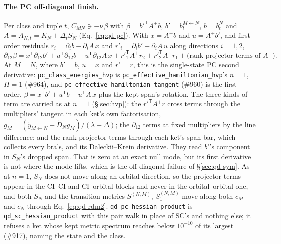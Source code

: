 \documentclass[11pt]{article}
\newcommand{\code}[1]{\texttt{#1}}
\newcommand{\T}{\mathsf T}
\begin{document}
\paragraph{The PC off-diagonal finish.} Per class and tuple $t$, $C_{MN}
\ni -\nu\,\beta$ with $\beta = b'^\T A^{+}b$, $b' = b^{M\leftarrow N}_t$, $b
= b^N_t$ and $A = A_{N,t} = K_N + \Delta_tS_N$ (Eq.~\eqref{eq:qd-pc}). With
$x = A^+b$ and $u = A^+b'$, and first-order residuals $r_i = \partial_ib -
\partial_iA\,x$ and $r'_i = \partial_ib' - \partial_iA\,u$ along directions
$i = 1, 2$,
\begin{equation}
  \partial_{12}\beta = x^\T\partial_{12}b' + u^\T\partial_{12}b
    - u^\T\partial_{12}A\,x
    + r'^\T_1A^+r_2 + r'^\T_2A^+r_1
    + \bigl(\text{rank-projector terms of }A^+\bigr).
  \label{eq:qd-pcfinish}
\end{equation}
At $M = N$, where $b' = b$, $u = x$ and $r' = r$, this is the single-state
PC second derivative: \code{pc\_class\_energies\_hvp} is
\code{pc\_effective\_hamiltonian\_hvp}'s $n = 1$, $\bar H = 1$ (\#964),
and \code{pc\_effective\_hamiltonian\_tangent} (\#960) is the first order,
$\dot\beta = x^\T\dot b' + u^\T\dot b - u^\T\dot A\,x$ plus the kept span's
rotation. The three kinds of term are carried as at $n = 1$
(\S\ref{sec:hvp}): the $r'^\T A^+r$ cross terms through the multipliers'
tangent in each ket's own factorisation, $\dot g_M = (\dot y_{M\leftarrow N}
- \dot D_Ng_M)/(\lambda + \Delta)$; the $\partial_{12}$ terms at fixed
multipliers by the line difference; and the rank-projector terms through
each ket's span bar, which collects every bra's, and its Daleckii--Krein
derivative. They read $b'$'s component in $S_N$'s dropped span. That is
zero at an exact null mode, but its first derivative is not where the mode
lifts, which is the off-diagonal failure of \S\ref{sec:qd-sym}. As at
$n = 1$, $S_N$ does not move along an orbital direction, so the projector
terms appear in the CI--CI and CI--orbital blocks and never in the
orbital--orbital one, and both $S_N$ and the transition metrics
$S^{(N,M)}$, $S_1^{(N,M)}$ move along both $c_M$ and $c_N$ through
Eq.~\eqref{eq:qd-rdm2}. \code{qd\_pc\_hessian\_product} is
\code{qd\_sc\_hessian\_product} with this pair walk in place of SC's and
nothing else; it refuses a ket whose kept metric spectrum reaches below
$10^{-10}$ of its largest (\#917), naming the state and the class.
\end{document}
